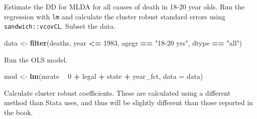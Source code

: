 \documentclass[]{book}
\newenvironment{Shaded}{\begin{snugshade}}{\end{snugshade}}
\newcommand{\DataTypeTok}[1]{\textcolor[rgb]{0.13,0.29,0.53}{#1}}
\newcommand{\DecValTok}[1]{\textcolor[rgb]{0.00,0.00,0.81}{#1}}
\newcommand{\KeywordTok}[1]{\textcolor[rgb]{0.13,0.29,0.53}{\textbf{#1}}}
\newcommand{\NormalTok}[1]{#1}
\newcommand{\OperatorTok}[1]{\textcolor[rgb]{0.81,0.36,0.00}{\textbf{#1}}}
\newcommand{\StringTok}[1]{\textcolor[rgb]{0.31,0.60,0.02}{#1}}
\theoremstyle{definition}
\theoremstyle{definition}
\theoremstyle{definition}
\theoremstyle{remark}
\begin{document}
Estimate the DD for MLDA for all causes of death in 18-20 year olds. Run
the regression with \texttt{lm} and calculate the cluster robust
standard errors using \texttt{sandwich::vcovCL}. Subset the data.

\begin{Shaded}
\begin{Highlighting}[]
\NormalTok{data <-}\StringTok{ }\KeywordTok{filter}\NormalTok{(deaths, year }\OperatorTok{<=}\StringTok{ }\DecValTok{1983}\NormalTok{, agegr }\OperatorTok{==}\StringTok{ "18-20 yrs"}\NormalTok{, dtype }\OperatorTok{==}\StringTok{ "all"}\NormalTok{)}
\end{Highlighting}
\end{Shaded}

Run the OLS model.

\begin{Shaded}
\begin{Highlighting}[]
\NormalTok{mod <-}\StringTok{ }\KeywordTok{lm}\NormalTok{(mrate }\OperatorTok{~}\StringTok{ }\DecValTok{0} \OperatorTok{+}\StringTok{ }\NormalTok{legal }\OperatorTok{+}\StringTok{ }\NormalTok{state }\OperatorTok{+}\StringTok{ }\NormalTok{year_fct, }\DataTypeTok{data =}\NormalTok{ data)}
\end{Highlighting}
\end{Shaded}

Calculate cluster robust coefficients. These are calculated using a
different method than Stata uses, and thus will be slightly different
than those reported in the book.

\begin{Shaded}
\end{Shaded}
\end{document}
